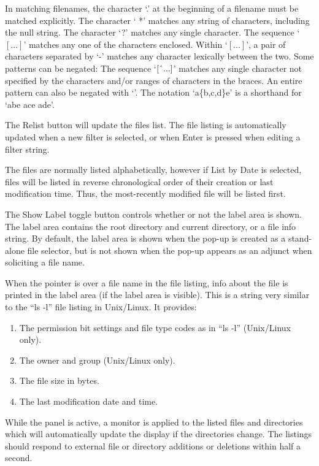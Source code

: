 In matching filenames, the character `{\vt .}' at the beginning of a
filename must be matched explicitly.  The character `{\vt
*}' matches any string of characters, including the null string.  The
character `{\vt ?}' matches any single character.  The sequence
`$[...]$' matches any one of the characters enclosed.  Within
`$[...]$', a pair of characters separated by `{\vt -}' matches any
character lexically between the two.  Some patterns can be negated: 
The sequence `$[\symbol{94}...]$' matches any single character not
specified by the characters and/or ranges of characters in the braces. 
An entire pattern can also be negated with `{\vt {}}'.  The
notation `{\vt a}\{{\vt b,c,d}\}{\vt e}' is a shorthand for `{\vt abe
ace ade}'.

The {\cb Relist} button will update the files list.  The file listing
is automatically updated when a new filter is selected, or when {\kb
Enter} is pressed when editing a filter string.

The files are normally listed alphabetically, however if {\cb List by
Date} is selected, files will be listed in reverse chronological order
of their creation or last modification time.  Thus, the most-recently
modified file will be listed first.

The {\cb Show Label} toggle button controls whether or not the label
area is shown.  The label area contains the root directory and current
directory, or a file info string.  By default, the label area is shown
when the pop-up is created as a stand-alone file selector, but is not
shown when the pop-up appears as an adjunct when soliciting a file
name.

When the pointer is over a file name in the file listing, info about
the file is printed in the label area (if the label area is visible). 
This is a string very similar to the ``{\vt ls -l}'' file listing in
Unix/Linux.  It provides:

\begin{enumerate}
\item{The permission bit settings and file type codes as in 
  ``{\vt ls -l}'' (Unix/Linux only).}
\item{The owner and group (Unix/Linux only).}
\item{The file size in bytes.}
\item{The last modification date and time.}
\end{enumerate}

While the panel is active, a monitor is applied to the listed files
and directories which will automatically update the display if the
directories change.  The listings should respond to external file or
directory additions or deletions within half a second.

